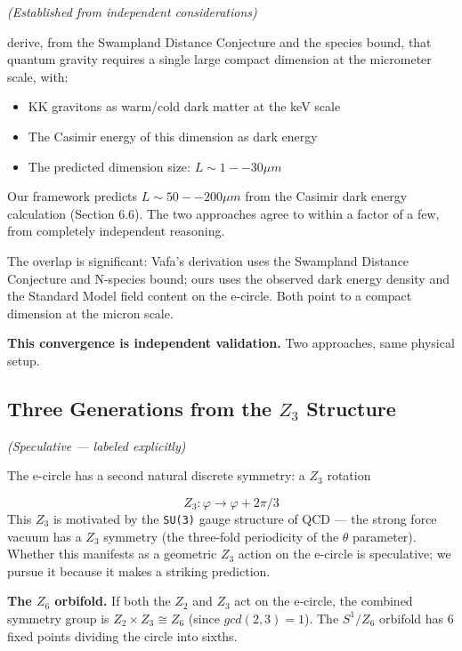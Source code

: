 \documentclass[aps,prd,preprint,superscriptaddress,longbibliography,floatfix]{revtex4-2}
\theoremstyle{remark}
\begin{document}
\textit{(Established from independent considerations)}

\cite{VafaDarkDimension2022} derive, from the Swampland Distance Conjecture and the species bound, that quantum gravity requires a single large compact dimension at the micrometer scale, with:

\begin{itemize}
  \item KK gravitons as warm/cold dark matter at the keV scale
  \item The Casimir energy of this dimension as dark energy
  \item The predicted dimension size: $L \sim  1--30 \mu m$
\end{itemize}

Our framework predicts $L \sim  50--200 \mu m$ from the Casimir dark energy calculation (Section 6.6). The two approaches agree to within a factor of a few, from completely independent reasoning.

The overlap is significant: Vafa's derivation uses the Swampland Distance Conjecture and N-species bound; ours uses the observed dark energy density and the Standard Model field content on the e-circle. Both point to a compact dimension at the micron scale.

\textbf{This convergence is independent validation.} Two approaches, same physical setup.



\subsection{Three Generations from the $Z_{3}$ Structure}

\textit{(Speculative --- labeled explicitly)}

The e-circle has a second natural discrete symmetry: a $Z_{3}$ rotation


\begin{equation}
    Z_{3}: \varphi \to \varphi + 2\pi/3
\end{equation}
This $Z_{3}$ is motivated by the \texttt{SU(3)} gauge structure of QCD --- the strong force vacuum has a $Z_{3}$ symmetry (the three-fold periodicity of the $\theta$ parameter). Whether this manifests as a geometric $Z_{3}$ action on the e-circle is speculative; we pursue it because it makes a striking prediction.

\textbf{The $Z_{6}$ orbifold.} If both the $Z_{2}$ and $Z_{3}$ act on the e-circle, the combined symmetry group is $Z_{2} \times Z_{3} \cong Z_{6}$ (since $gcd(2,3) = 1$). The $S^{1}/Z_{6}$ orbifold has 6 fixed points dividing the circle into sixths.
\end{document}
